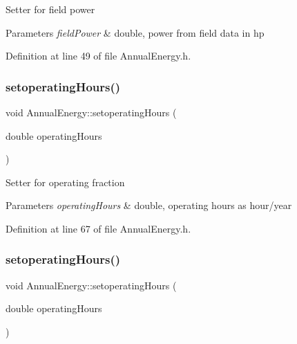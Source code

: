 Setter for field power 
\begin{DoxyParams}{Parameters}
{\em field\+Power} & double, power from field data in hp \\
\hline
\end{DoxyParams}


Definition at line 49 of file Annual\+Energy.\+h.

\mbox{\label{class_annual_energy_a803812f06ca88aca8a02601930e870cf}} 
\subsubsection{\texorpdfstring{setoperating\+Hours()}{setoperatingHours()}\hspace{0.1cm}{\footnotesize\ttfamily [1/3]}}
{\footnotesize\ttfamily void Annual\+Energy\+::setoperating\+Hours (\begin{DoxyParamCaption}\item[{double}]{operating\+Hours }\end{DoxyParamCaption})\hspace{0.3cm}{\ttfamily [inline]}}

Setter for operating fraction


\begin{DoxyParams}{Parameters}
{\em operating\+Hours} & double, operating hours as hour/year \\
\hline
\end{DoxyParams}


Definition at line 67 of file Annual\+Energy.\+h.

\mbox{\label{class_annual_energy_a803812f06ca88aca8a02601930e870cf}} 
\subsubsection{\texorpdfstring{setoperating\+Hours()}{setoperatingHours()}\hspace{0.1cm}{\footnotesize\ttfamily [2/3]}}
{\footnotesize\ttfamily void Annual\+Energy\+::setoperating\+Hours (\begin{DoxyParamCaption}\item[{double}]{operating\+Hours }\end{DoxyParamCaption})\hspace{0.3cm}{\ttfamily [inline]}}

